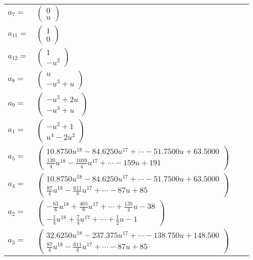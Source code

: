 \documentclass[1p]{elsarticle_modified}
\theoremstyle{definition}
\begin{document}
\begin{tabular}{m{7pt} m{180pt} m{7pt} m{180pt} }
\flushright $a_{7}=$&$\begin{pmatrix}0\\u\end{pmatrix}$ \\
\flushright $a_{11}=$&$\begin{pmatrix}1\\0\end{pmatrix}$ \\
\flushright $a_{12}=$&$\begin{pmatrix}1\\- u^2\end{pmatrix}$ \\
\flushright $a_{8}=$&$\begin{pmatrix}u\\- u^3+u\end{pmatrix}$ \\
\flushright $a_{9}=$&$\begin{pmatrix}- u^3+2 u\\- u^3+u\end{pmatrix}$ \\
\flushright $a_{1}=$&$\begin{pmatrix}- u^2+1\\u^4-2 u^2\end{pmatrix}$ \\
\flushright $a_{5}=$&$\begin{pmatrix}10.8750 u^{18}-84.6250 u^{17}+\cdots-51.7500 u+63.5000\\\frac{139}{4} u^{18}-\frac{1059}{4} u^{17}+\cdots-159 u+191\end{pmatrix}$ \\
\flushright $a_{4}=$&$\begin{pmatrix}10.8750 u^{18}-84.6250 u^{17}+\cdots-51.7500 u+63.5000\\\frac{87}{4} u^{18}-\frac{611}{4} u^{17}+\cdots-87 u+85\end{pmatrix}$ \\
\flushright $a_{2}=$&$\begin{pmatrix}-\frac{63}{8} u^{18}+\frac{465}{8} u^{17}+\cdots+\frac{135}{4} u-38\\-\frac{1}{4} u^{18}+\frac{7}{4} u^{17}+\cdots+\frac{1}{2} u-1\end{pmatrix}$ \\
\flushright $a_{3}=$&$\begin{pmatrix}32.6250 u^{18}-237.375 u^{17}+\cdots-138.750 u+148.500\\\frac{87}{4} u^{18}-\frac{611}{4} u^{17}+\cdots-87 u+85\end{pmatrix}$ \\

\end{tabular}
\end{document}

